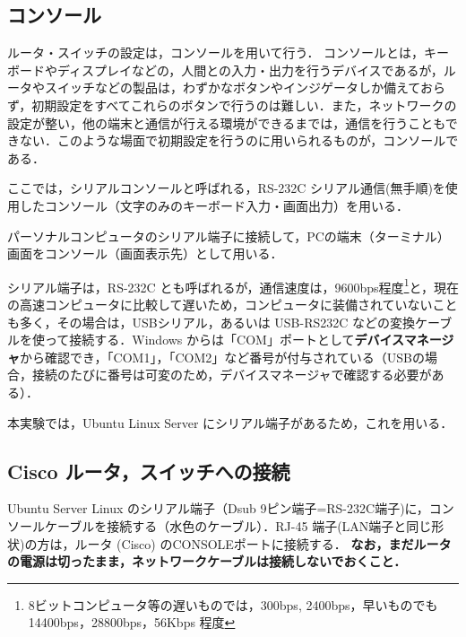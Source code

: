 \subsection{コンソール}
ルータ・スイッチの設定は，コンソールを用いて行う．
コンソールとは，キーボードやディスプレイなどの，人間との入力・出力を行うデバイスであるが，ルータやスイッチなどの製品は，わずかなボタンやインジゲータしか備えておらず，初期設定をすべてこれらのボタンで行うのは難しい．また，ネットワークの設定が整い，他の端末と通信が行える環境ができるまでは，通信を行うこともできない．このような場面で初期設定を行うのに用いられるものが，コンソールである．

ここでは，シリアルコンソールと呼ばれる，RS-232C シリアル通信(無手順)を使用したコンソール（文字のみのキーボード入力・画面出力）を用いる．

パーソナルコンピュータのシリアル端子に接続して，PCの端末（ターミナル）画面をコンソール（画面表示先）として用いる．

シリアル端子は，RS-232C とも呼ばれるが，通信速度は，9600bps程度\footnote{8ビットコンピュータ等の遅いものでは，300bps, 2400bps，早いものでも 14400bps，28800bps，56Kbps 程度}と，現在の高速コンピュータに比較して遅いため，コンピュータに装備されていないことも多く，その場合は，USBシリアル，あるいは USB-RS232C などの変換ケーブルを使って接続する．Windows からは「COM」ポートとして\textbf{デバイスマネージャ}から確認でき，「COM1」，「COM2」など番号が付与されている（USBの場合，接続のたびに番号は可変のため，デバイスマネージャで確認する必要がある）．

本実験では，Ubuntu Linux Server にシリアル端子があるため，これを用いる．

\subsection{Cisco ルータ，スイッチへの接続}
Ubuntu Server Linux のシリアル端子（Dsub 9ピン端子=RS-232C端子)に，コンソールケーブルを接続する（水色のケーブル）．RJ-45 端子(LAN端子と同じ形状)の方は，ルータ (Cisco) のCONSOLEポートに接続する．
\textbf{なお，まだルータの電源は切ったまま，ネットワークケーブルは接続しないでおくこと．}

